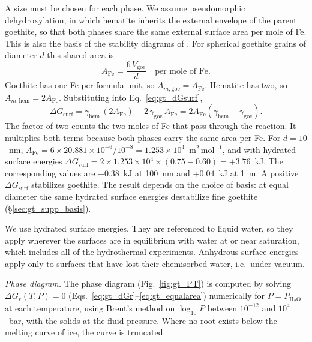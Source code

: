 A size must be chosen for each phase. We assume pseudomorphic dehydroxylation, in which hematite
inherits the external envelope of the parent goethite, so that both phases share the same
external surface area per mole of Fe. This is also the basis of the stability diagrams of
\citet{navrotsky2008}. For spherical goethite grains of diameter $d$ this shared area is
\begin{equation}
  A_{\mathrm{Fe}} = \frac{6\,V_{\mathrm{goe}}}{d}\quad\text{per mole of Fe}.
\end{equation}
Goethite has one Fe per formula unit, so $A_{m,\mathrm{goe}} = A_{\mathrm{Fe}}$. Hematite has two,
so $A_{m,\mathrm{hem}} = 2A_{\mathrm{Fe}}$. Substituting into Eq.~\eqref{eq:gt_dGsurf},
\begin{equation}
  \Delta G_{\mathrm{surf}} = \gamma_{\mathrm{hem}}\,(2A_{\mathrm{Fe}}) - 2\,\gamma_{\mathrm{goe}}\,A_{\mathrm{Fe}}
  = 2A_{\mathrm{Fe}}\left(\gamma_{\mathrm{hem}} - \gamma_{\mathrm{goe}}\right).
  \label{eq:gt_equalarea}
\end{equation}
The factor of two counts the two moles of Fe that pass through the reaction. It multiplies both
terms because both phases carry the same area per Fe. For $d=10$~nm,
$A_{\mathrm{Fe}} = 6\times20.881\times10^{-6}/10^{-8} = 1.253\times10^{4}$~m$^2$\,mol$^{-1}$, and
with hydrated surface energies
$\Delta G_{\mathrm{surf}} = 2\times1.253\times10^{4}\times(0.75-0.60) = +3.76$~kJ.
The corresponding values are $+0.38$~kJ at 100~nm and $+0.04$~kJ at 1~\textmu m. A positive
$\Delta G_{\mathrm{surf}}$ stabilizes goethite. The result depends on the choice of basis: at
equal diameter the same hydrated surface energies destabilize fine goethite
(\S\ref{sec:gt_supp_basis}).

We use hydrated surface energies. They are referenced to liquid water, so they apply wherever the
surfaces are in equilibrium with water at or near saturation, which includes all of the
hydrothermal experiments. Anhydrous surface energies apply only to surfaces that have lost their
chemisorbed water, i.e.\ under vacuum.

\textit{Phase diagram.} The phase diagram (Fig.~\ref{fig:gt_PT}) is computed by solving
$\Delta G_r(T,P) = 0$ (Eqs.~\eqref{eq:gt_dGr}--\eqref{eq:gt_equalarea}) numerically for
$P = P_{\mathrm{H_2O}}$ at each temperature, using Brent's method on $\log_{10}P$ between
$10^{-12}$ and $10^{4}$~bar, with the solids at the fluid pressure. Where no root exists below the
melting curve of ice, the curve is truncated.

